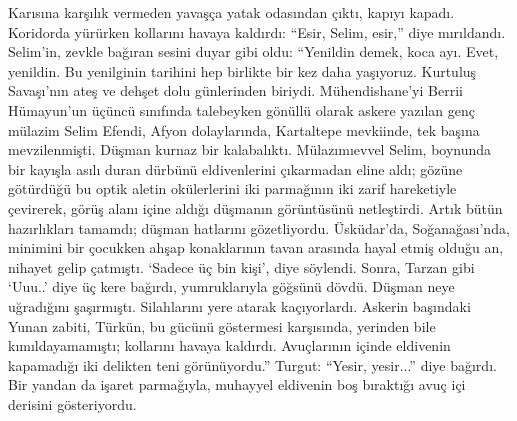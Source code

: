 \documentclass[a5paper,12pt]{scrbook}
\begin{document}
Karısına karşılık vermeden yavaşça yatak odasından çıktı, kapıyı kapadı.
Koridorda yürürken kollarını havaya kaldırdı: ``Esir, Selim, esir,'' diye
mırıldandı. Selim'in, zevkle bağıran sesini duyar gibi oldu: ``Yenildin demek,
koca ayı. Evet, yenildin. Bu yenilginin tarihini hep birlikte bir kez daha
yaşıyoruz. Kurtuluş Savaşı'nın ateş ve dehşet dolu günlerinden biriydi.
Mühendishane'yi Berrii Hümayun'un üçüncü sınıfında talebeyken gönüllü olarak
askere yazılan genç mülazim Selim Efendi, Afyon dolaylarında, Kartaltepe
mevkiinde, tek başına mevzilenmişti. Düşman kurnaz bir kalabalıktı.
Mülazımıevvel Selim, boynunda bir kayışla asılı duran dürbünü eldivenlerini
çıkarmadan eline aldı; gözüne götürdüğü bu optik aletin okülerlerini iki
parmağının iki zarif hareketiyle çevirerek, görüş alanı içine aldığı düşmanın
görüntüsünü netleştirdi. Artık bütün hazırlıkları tamamdı; düşman hatlarını
gözetliyordu. Üsküdar'da, Soğanağası'nda, minimini bir çocukken ahşap
konaklarının tavan arasında hayal etmiş olduğu an, nihayet gelip çatmıştı.
`Sadece üç bin kişi', diye söylendi. Sonra, Tarzan gibi `Uuu..' diye üç kere
bağırdı, yumruklarıyla göğsünü dövdü. Düşman neye uğradığını şaşırmıştı.
Silahlarını yere atarak kaçıyorlardı. Askerin başındaki Yunan zabiti, Türkün, bu
gücünü göstermesi karşısında, yerinden bile kımıldayamamıştı; kollarını havaya
kaldırdı. Avuçlarının içinde eldivenin kapamadığı iki delikten teni
görünüyordu.'' Turgut: ``Yesir, yesir...'' diye bağırdı. Bir yandan da işaret
parmağıyla, muhayyel eldivenin boş bıraktığı avuç içi derisini gösteriyordu.
\end{document}
